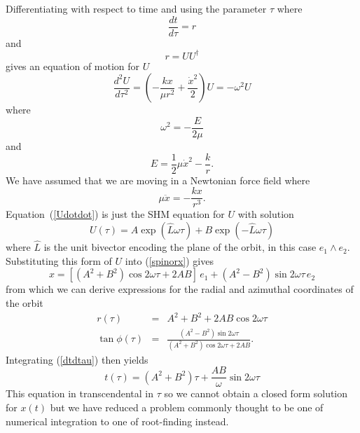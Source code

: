\documentclass[12pt]{article}
\newcommand{\nn}{\nonumber}
\newcommand{\wdg}{\! \wedge \!}
\newcommand{\half}{{\textstyle \frac{1}{2}}}
\newcommand{\om}{\omega}
\begin{document}
Differentiating with respect to time and using the parameter $\tau$ where
%
\begin{equation} \label{dtdtau}
\frac{dt}{d\tau} = r
\end{equation}
%
and
%
\begin{equation}
r = UU^\dag
\end{equation}
%
gives an equation of motion for $U$
%
\begin{equation} \label{Udotdot}
\frac{d^2U}{d\tau^2} = \left(-\frac{kx}{\mu r^2} + \frac{\dot{x}^2}{2} \right) U = -\om^2 U
\end{equation}
%
where
%
\begin{equation}
\om^2 = -\frac{E}{2\mu}
\end{equation}
%
and
%
\begin{equation}
E = \half \mu \dot{x}^2 - \frac{k}{r}.
\end{equation}
%
We have assumed that we are moving in a Newtonian force field where
%
\begin{equation}
\mu \ddot{x} = -\frac{k x}{r^3}.
\end{equation}
%
Equation~(\ref{Udotdot}) is just the SHM equation for $U$ with solution
%
\begin{equation}
U(\tau) = A \exp({\hat{L}\om\tau}) + B \exp({-\hat{L}\om\tau})
\end{equation}
%
where $\hat{L}$ is the unit bivector encoding the plane of the orbit, in this case $e_1 \wdg e_2$. Substituting this form of $U$ into (\ref{spinorx}) gives
%
\begin{equation}
x = \left[ (A^2+B^2)\cos2\om\tau + 2AB \right] \,e_1 + (A^2-B^2)\sin2\om\tau \,e_2
\end{equation}
%
from which we can derive expressions for the radial and azimuthal coordinates of the orbit
%
\begin{eqnarray}
r(\tau) & = & A^2 + B^2 + 2AB\cos2\om\tau \\ \nn
\tan \phi(\tau) & = & \frac{(A^2-B^2)\sin2\om\tau}{(A^2+B^2)\cos2\om\tau + 2AB}.
\end{eqnarray}
%
Integrating (\ref{dtdtau}) then yields
%
\begin{equation}
t(\tau) = (A^2+B^2)\tau + \frac{AB}{\om}\sin2\om\tau
\end{equation}
%
This equation in transcendental in $\tau$ so we cannot obtain a closed form solution for $x(t)$ but we have reduced a problem commonly thought to be one of numerical integration to one of root-finding instead.
\end{document}
